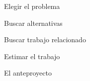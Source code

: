 Elegir el problema

Buscar alternativas

Buscar trabajo relacionado

Estimar el trabajo

El anteproyecto